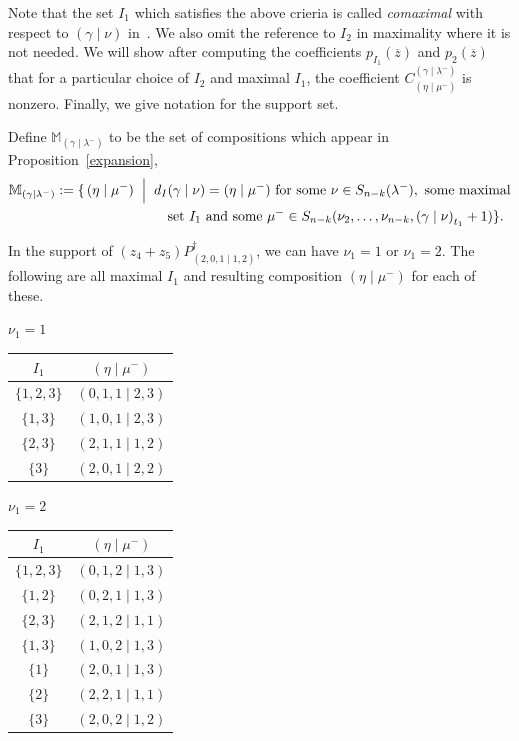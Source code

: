 \documentclass[ALCO]{cedram}
\newcommand{\PB}[1]{P_{#1}^\dagger}
\newcommand{\MM}{\mathbb{M}_{\gammalambdamin}}
\newcommand{\gammalambdamin}{{(\gamma \mid \lambda^-)}}
\newcommand{\gammanu}{{(\gamma \mid \nu)}}
\newcommand{\etamu}{{(\eta \mid \mu^-)}}
\newcommand{\pIone}{p_{I_1}(\overline{z})}
\newcommand{\pItwo}{p_{2}(\overline{z})}
\newcommand{\dI}{d_I}
\begin{document}
Note that the set $I_1$ which satisfies the above crieria is called \textit{comaximal} with respect to $\gammanu$ in~\cite{MR2525842}. We also omit the reference to $I_2$ in maximality where it is not needed. We will show after computing the coefficients $\pIone$ and $\pItwo$ that for a particular choice of $I_2$ and maximal $I_1$, the coefficient $C^{\gammalambdamin}_{\etamu}$ is nonzero. Finally, we give notation for the support set.

\begin{defi}
Define $\MM$ to be the set of compositions which appear in Proposition~\ref{expansion},
\begin{align*} \MM := \{\, \etamu \hspace*{.2cm} \Big| \hspace*{.2cm} \dI &\gammanu = \etamu \text{ for some } \nu \in S_{n-k}(\lambda^-), \text{ some maximal} \\ & \text{set } I_1 \text{ and some } \mu^- \in S_{n-k}(\nu_2, \dotsc, \nu_{n-k}, \gammanu_{t_1}+1)\} .\end{align*}
\end{defi}


\begin{exam}
    In the support of $(z_4+z_5)\PB{(2,0,1 \mid 1,2)}$, we can have $\nu_1=1$ or $\nu_1=2$. The following are all maximal $I_1$ and resulting composition $\etamu$ for each of these.

    \begin{center} 
        $\nu_1=1$ \quad\begin{tabular}{c|c} $I_1$ & $\etamu$ \\ \hline
        $\{1,2,3\}$ & $(0,1,1 \mid 2,3)$  \\
        $\{1,3\}$ & $(1,0,1 \mid 2,3)$ \\
        $\{2,3\}$ & $(2,1,1 \mid 1,2)$\\
        $\{3\}$ & $(2,0,1 \mid 2,2)$\end{tabular} \qquad $\nu_1=2$ \quad\begin{tabular}{c|c} $I_1$ & $\etamu$ \\ \hline
        $\{1,2,3\}$ & $(0,1,2 \mid 1,3)$  \\
        $\{1,2\}$ & $(0,2,1\mid 1,3)$ \\
        $\{2,3\}$ & $(2,1,2 \mid 1, 1)$\\
        $\{1,3\}$ & $(1,0,2\mid 1,3)$\\
        $\{1\}$ & $(2,0,1 \mid 1, 3)$\\
        $\{2\}$ & $(2,2,1 \mid 1,1)$\\
        $\{3\}$ & $(2,0,2 \mid 1,2)$\end{tabular}
    \end{center}
\end{exam}
\end{document}
